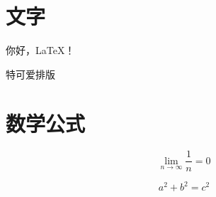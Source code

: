 \documentclass[fontset=fandol]{ctexart}
\begin{document}
\section{文字}

你好，LaTeX！

特可爱排版

\section{数学公式}
\[
\lim_{n\to\infty}\frac{1}{n}=0
\]

\[
a^2+b^2=c^2
\]
\end{document}
